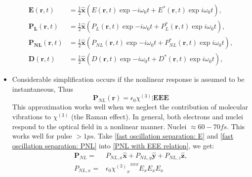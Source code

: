 \documentclass[12pt]{extarticle}
\numberwithin{equation}{section}
\numberwithin{figure}{section}
\numberwithin{table}{section}
\newcommand{\<}{\langle}
\renewcommand{\>}{\rangle}
\theoremstyle{definition}
\begin{document}
\begin{itemize}
                \begin{subequations}
                \label{fast oscillation separation}
                    \begin{align}
                        \boldsymbol{E}(\boldsymbol{r},t)&=\frac{1}{2}\hat{\boldsymbol{x}}(E(\boldsymbol{r},t)\exp{-i\omega_0 t}+E^{*}(\boldsymbol{r},t)\exp{i\omega_0 t}),\label{fast oscillation separation: E}\\
                        \boldsymbol{P_L}(\boldsymbol{r},t)&=\frac{1}{2}\hat{\boldsymbol{x}}(P_L(\boldsymbol{r},t)\exp{-i\omega_0 t}+P_L^{*}(\boldsymbol{r},t)\exp{i\omega_0 t}),\label{fast oscillation separation: P}\\
                        \boldsymbol{P_{NL}}(\boldsymbol{r},t)&=\frac{1}{2}\hat{\boldsymbol{x}}(P_{NL}(\boldsymbol{r},t)\exp{-i\omega_0 t}+P_{NL}^{*}(\boldsymbol{r},t)\exp{i\omega_0 t}),\label{fast oscillation separation: PNL}\\
                        \boldsymbol{D}(\boldsymbol{r},t)&=\frac{1}{2}\hat{\boldsymbol{x}}(D(\boldsymbol{r},t)\exp{-i\omega_0 t}+D^{*}(\boldsymbol{r},t)\exp{i\omega_0 t}),\label{fast oscillation separation: D}
                    \end{align}
                \end{subequations}
            \item Considerable simplification occurs if the nonlinear response is assumed to be instantaneous, Thus
                \begin{equation}
                    \label{PNL with EEE relation}
                    \boldsymbol{P}_{NL}(\boldsymbol{r}) = \epsilon_0 \chi^{(3)} \vdots \boldsymbol{EEE}
                \end{equation}
                This approximation works well when we neglect the contribution of molecular vibrations to $\chi^{(3)}$ (the Raman effect). In general, both electrons and nuclei respond to the optical field in a nonlinear manner. Nuclei $\approx 60-70fs$. This works well for pulse $>1ps$. Take \autoref{fast oscillation separation: E} and \autoref{fast oscillation separation: PNL} into \autoref{PNL with EEE relation}, we get:
                \begin{equation}
                \begin{split}
                    \boldsymbol{P}_{NL}=& P_{NL,x}\hat{\boldsymbol{x}}+P_{NL,y}\hat{\boldsymbol{y}}+P_{NL,z}\hat{\boldsymbol{z}},\\
                    P_{NL,x}=&\epsilon_0 {{\chi^{(3)}}_x}^{xxx} E_x E_x E_x\\

\end{split}
\end{equation}
\end{itemize}
\end{document}
